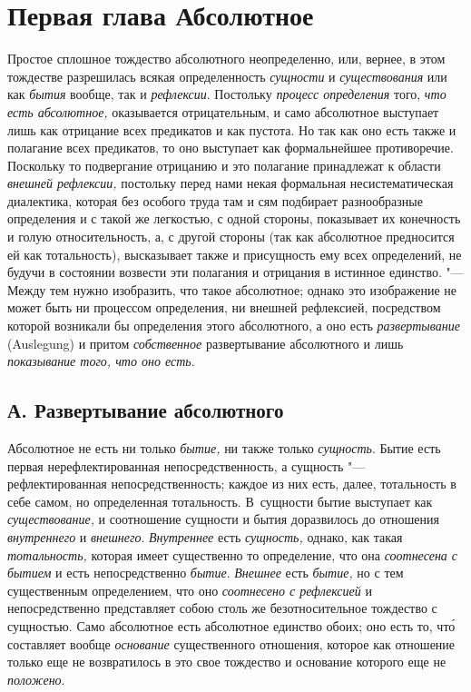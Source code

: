 \chapter[{\em Первая глава} Абсолютное]{Первая глава Абсолютное}

Простое сплошное тождество абсолютного неопределенно, или, вернее, в этом
тождестве разрешилась всякая определенность {\em сущности} и
{\em существования} или как {\em бытия} вообще, так и {\em рефлексии}.
Постольку {\em процесс определения} того, {\em что есть абсолютное,}
оказывается отрицательным, и
само абсолютное выступает лишь как отрицание всех предикатов и как пустота.
Но так как оно есть также и полагание всех предикатов, то оно выступает как
формальнейшее противоречие. Поскольку то подвергание отрицанию и это
полагание принадлежат к области {\em внешней
рефлексии,} постольку перед нами некая формальная несистематическая
диалектика, которая без особого труда там и сям подбирает разнообразные
определения и с такой же легкостью, с одной стороны, показывает их
конечность и голую относительность, а, с другой стороны (так как абсолютное
предносится ей как тотальность), высказывает также и присущность ему всех
определений, не будучи в состоянии возвести эти полагания и отрицания в
истинное единство. "--- Между тем нужно изобразить, что такое абсолютное;
однако это изображение не может быть ни процессом определения, ни внешней
рефлексией, посредством которой возникали бы определения этого абсолютного,
а оно есть {\em развертывание} (Auslegung) и притом
{\em собственное} развертывание абсолютного и лишь
{\em показывание того, что оно есть}.

\section[А. Развертывание абсолютного]{А. Развертывание абсолютного}

Абсолютное не есть ни только
{\em бытие,} ни также только
{\em сущность}. Бытие есть первая нерефлектированная
непосредственность, а сущность "--- рефлектированная непосредственность;
каждое из них есть, далее, тотальность в себе самом, но определенная
тотальность. В~сущности бытие выступает как
{\em существование,} и соотношение сущности и бытия
доразвилось до отношения {\em внутреннего} и
{\em внешнего}. {\em Внутреннее}
есть {\em сущность,} однако, как такая
{\em тотальность,} которая имеет существенно то
определение, что она {\em соотнесена с бытием} и есть
непосредственно {\em бытие}.
{\em Внешнее} есть {\em бытие,} но
с тем существенным определением, что оно
{\em соотнесено с рефлексией} и непосредственно
представляет собою столь же безотносительное тождество с сущностью. Само
абсолютное есть абсолютное единство обоих; оно есть то, чт\'{о} составляет
вообще {\em основание} существенного отношения, которое
как отношение только еще не возвратилось в это свое тождество и основание
которого еще не {\em положено}.

